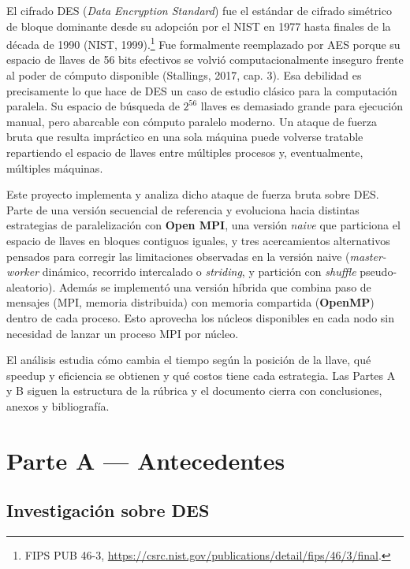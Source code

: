 \documentclass[11pt,letterpaper]{article}
\begin{document}
El cifrado DES (\textit{Data Encryption Standard}) fue el estándar de
cifrado simétrico de bloque dominante desde su adopción por el NIST en
1977 hasta finales de la década de 1990 (NIST, 1999).\footnote{FIPS PUB 46-3, \url{https://csrc.nist.gov/publications/detail/fips/46/3/final}.} Fue formalmente
reemplazado por AES porque su espacio de llaves de 56 bits efectivos
se volvió computacionalmente inseguro frente al poder de cómputo
disponible (Stallings, 2017, cap. 3). Esa debilidad es precisamente lo
que hace de DES un caso de estudio clásico para la computación
paralela. Su espacio de búsqueda de $2^{56}$ llaves es demasiado
grande para ejecución manual, pero abarcable con cómputo paralelo
moderno. Un ataque de fuerza bruta que resulta impráctico en una sola
máquina puede volverse tratable repartiendo el espacio de llaves entre
múltiples procesos y, eventualmente, múltiples máquinas.

Este proyecto implementa y analiza dicho ataque de fuerza bruta sobre
DES. Parte de una versión secuencial de referencia y evoluciona hacia
distintas estrategias de paralelización con \textbf{Open MPI}, una
versión \textit{naive} que particiona el espacio de llaves en bloques
contiguos iguales, y tres acercamientos alternativos pensados para
corregir las limitaciones observadas en la versión naive
(\textit{master-worker} dinámico, recorrido intercalado o
\textit{striding}, y partición con \textit{shuffle} pseudo-aleatorio).
Además se implementó una versión híbrida que combina paso de mensajes
(MPI, memoria distribuida) con memoria compartida (\textbf{OpenMP})
dentro de cada proceso. Esto aprovecha los núcleos disponibles en cada
nodo sin necesidad de lanzar un proceso MPI por núcleo.

El análisis estudia cómo cambia el tiempo según la
posición de la llave, qué speedup y eficiencia se obtienen y qué
costos tiene cada estrategia. Las Partes A y B siguen la estructura de
la rúbrica y el documento cierra con conclusiones, anexos y bibliografía.

\section{Parte A --- Antecedentes}

\subsection{Investigación sobre DES}
\end{document}
